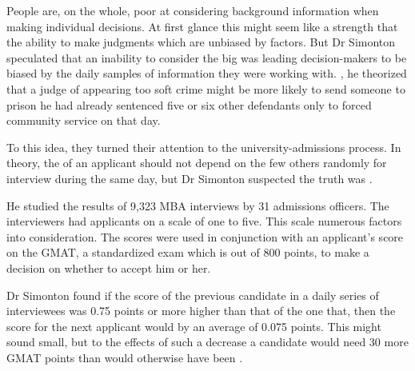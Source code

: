 People are, on the whole, poor at considering background
information when making individual decisions. At first glance this
might seem like a strength that \underline{\quad} the
ability to make judgments which are unbiased by
\underline{\quad} factors. But Dr Simonton speculated that
an inability to consider the big \underline{\quad} was
leading decision-makers to be biased by the daily samples of
information they were working with. \underline{\quad}, he
theorized that a judge \underline{\quad} of appearing too
soft \underline{\quad}crime might be more likely to send
someone to prison \underline{\quad} he had already sentenced
five or six other defendants only to forced community service on
that day.

To \underline{\quad} this idea, they turned their attention
to the university-admissions process. In theory, the \underline{\quad} of an
applicant should not depend on the few others \underline{\quad} randomly for interview during the same day, but Dr Simonton suspected the truth was \underline{\quad}.

He studied the results of 9,323 MBA interviews \underline{\quad} by 31 admissions officers. The interviewers had \underline{\quad} applicants on a scale of one to five. This scale \underline{\quad} numerous factors into consideration. The scores were \underline{\quad} used in conjunction with an applicant’s score on the GMAT, a standardized exam which is \underline{\quad} out of 800 points, to make a decision on whether to accept him or her.

Dr Simonton found if the score of the previous candidate in a daily series of interviewees was 0.75 points or more higher than that of the one \underline{\quad} that, then the score for the next applicant would \underline{\quad} by an average of 0.075 points. This might sound small, but to \underline{\quad} the effects of such a decrease a candidate would need 30 more GMAT points than would otherwise have been \underline{\quad}.

